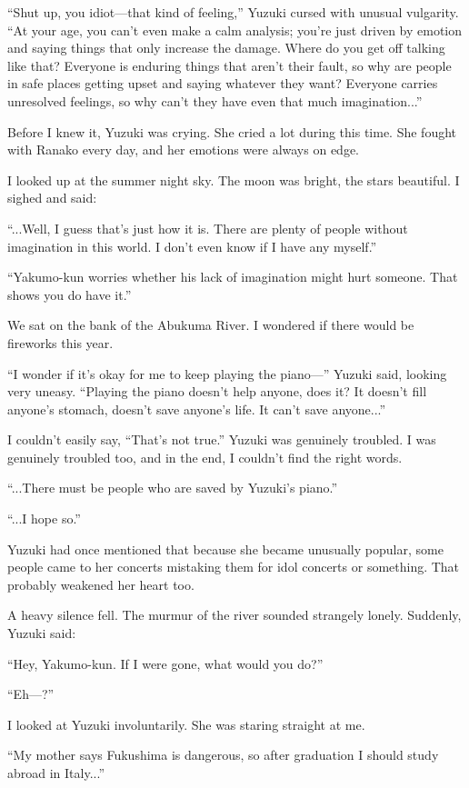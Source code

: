 \documentclass[
    a4paper,
    12pt,
    twoside,
    openany,
    UTF8,
    fontset=windows
]{ctexbook}
\begin{document}
``Shut up, you idiot---that kind of feeling,'' Yuzuki cursed with unusual vulgarity. ``At your age, you can't even make a calm analysis; you're just driven by emotion and saying things that only increase the damage. Where do you get off talking like that? Everyone is enduring things that aren't their fault, so why are people in safe places getting upset and saying whatever they want? Everyone carries unresolved feelings, so why can't they have even that much imagination...''

Before I knew it, Yuzuki was crying. She cried a lot during this time. She fought with Ranako every day, and her emotions were always on edge.

I looked up at the summer night sky. The moon was bright, the stars beautiful. I sighed and said:

``...Well, I guess that's just how it is. There are plenty of people without imagination in this world. I don't even know if I have any myself.''

``Yakumo-kun worries whether his lack of imagination might hurt someone. That shows you do have it.''

We sat on the bank of the Abukuma River. I wondered if there would be fireworks this year.

``I wonder if it's okay for me to keep playing the piano---'' Yuzuki said, looking very uneasy. ``Playing the piano doesn't help anyone, does it? It doesn't fill anyone's stomach, doesn't save anyone's life. It can't save anyone...''

I couldn't easily say, ``That's not true.'' Yuzuki was genuinely troubled. I was genuinely troubled too, and in the end, I couldn't find the right words.

``...There must be people who are saved by Yuzuki's piano.''

``...I hope so.''

Yuzuki had once mentioned that because she became unusually popular, some people came to her concerts mistaking them for idol concerts or something. That probably weakened her heart too.

A heavy silence fell. The murmur of the river sounded strangely lonely. Suddenly, Yuzuki said:

``Hey, Yakumo-kun. If I were gone, what would you do?''

``Eh---?''

I looked at Yuzuki involuntarily. She was staring straight at me.

``My mother says Fukushima is dangerous, so after graduation I should study abroad in Italy...''
\end{document}
